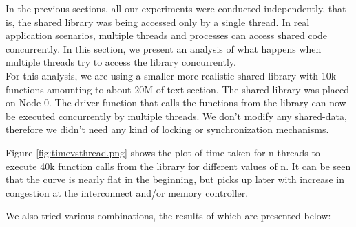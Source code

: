 In the previous sections, all our experiments were conducted independently, that is, the shared library
was being accessed only by a single thread. In real application scenarios, multiple threads and processes
can access shared code concurrently. In this section, we present an analysis of what happens when multiple
threads try to access the library concurrently.\\
For this analysis, we are using a smaller more-realistic shared library with 10k functions amounting to about 20M 
of text-section. The shared library was placed on Node 0. The driver function that calls the functions from 
the library can now be executed concurrently by multiple threads.
We don't modify any shared-data, therefore we didn't need any kind of locking or synchronization mechanisms.

Figure \ref{fig:timevsthread.png} shows the plot of time taken for n-threads to execute 40k function calls from
the library for different values of n. It can be seen that the curve is nearly flat in the beginning, but picks up
later with increase in congestion at the interconnect and/or memory controller.

We also tried various combinations, the results of which are presented below:
\textbf{}
\begin{verbatim}
\end{verbatim}

